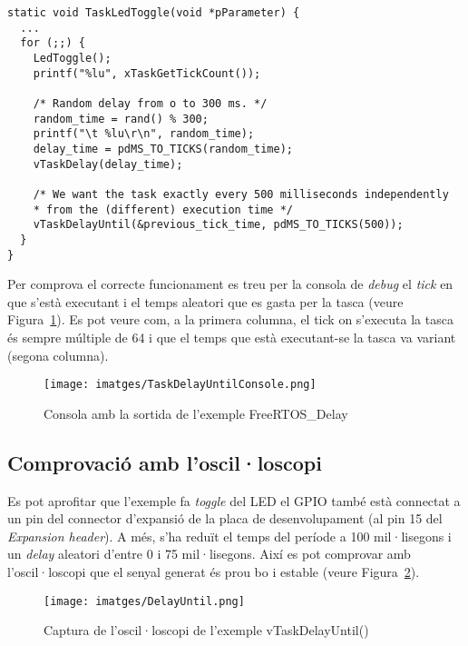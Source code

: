 \begin{lstlisting}[style=customc, label=FreeRTOS_Delay, caption=Tasca de l'exemple FreeRTOS\_Delay]
static void TaskLedToggle(void *pParameter) {
  ...
  for (;;) {
    LedToggle();
    printf("%lu", xTaskGetTickCount());

    /* Random delay from o to 300 ms. */
    random_time = rand() % 300;
    printf("\t %lu\r\n", random_time);
    delay_time = pdMS_TO_TICKS(random_time);
    vTaskDelay(delay_time);

    /* We want the task exactly every 500 milliseconds independently
    * from the (different) execution time */
    vTaskDelayUntil(&previous_tick_time, pdMS_TO_TICKS(500));
  }
}
\end{lstlisting}

Per comprova el correcte funcionament es treu per la consola de {\em debug} el {\em tick} en que s'està executant i el temps aleatori que es gasta per la tasca (veure Figura~\ref{fig:TaskDelayConsole}). Es pot veure com, a la primera columna, el tick on s'executa la tasca és sempre múltiple de 64 i que el temps que està executant-se la tasca va variant (segona columna).

\begin{figure}
 \centering
 \texttt{[image: imatges/TaskDelayUntilConsole.png]}
 \caption{Consola amb la sortida de l'exemple FreeRTOS\_Delay}
 \label{fig:TaskDelayConsole}
\end{figure}

\subsection{Comprovació amb l'oscil·loscopi}
Es pot aprofitar que l'exemple fa {\em toggle} del LED el GPIO també està connectat a un pin del connector d'expansió de la placa de desenvolupament (al pin 15 del {\em Expansion header}).
A més, s'ha reduït el temps del període a 100 mil·lisegons i un {\em delay} aleatori d'entre 0 i 75 mil·lisegons. Així es pot comprovar amb l'oscil·loscopi que el senyal generat és prou bo i estable (veure Figura~\ref{fig:DelayUntil}).

\begin{figure}
 \centering
 \texttt{[image: imatges/DelayUntil.png]}
 \caption{Captura de l'oscil·loscopi de l'exemple vTaskDelayUntil()}
 \label{fig:DelayUntil}
\end{figure}


